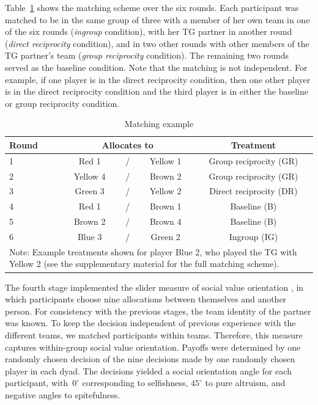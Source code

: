 \documentclass[12pt,a4paper]{article}\usepackage[]{graphicx}\usepackage[]{color}
\begin{document}
Table~\ref{tab:example} shows the matching scheme over the six rounds. Each participant was matched to be in the same group of three with a member of her own team in one of the six rounds (\emph{ingroup} condition), with her TG partner in another round (\emph{direct reciprocity} condition), and in two other rounds with other members of the TG partner's team (\emph{group reciprocity} condition). The remaining two rounds served as the baseline condition. Note that the matching is not independent. For example, if one player is in the direct reciprocity condition, then one other player is in the direct reciprocity condition and the third player is in either the baseline or group reciprocity condition.


\begin{table}
  \caption{Matching example}\label{tab:example}
  \begin{center}
    \begin{tabular}{lcccc}
    \toprule
    Round	&	\multicolumn{3}{c}{Allocates to}		&	Treatment	\\
    \midrule
    1	&	\color{red}Red 1	&	/	&	\color{yellow!80!black}Yellow 1	&	Group reciprocity (GR)	\\
    2	&	\color{yellow!80!black}Yellow 4	&	/	&	\color{brown}Brown 2	&	Group reciprocity (GR)	\\
    3	&	\color{green!60!black}Green 3	&	/	&	\color{yellow!80!black}Yellow 2	&	Direct reciprocity (DR)	\\
    4	&	\color{red}Red 1	&	/	&	\color{brown}Brown 1	&	Baseline (B)	\\
    5	&	\color{brown}Brown 2	&	/	&	\color{brown}Brown 4	&	Baseline (B)	\\
    6	&	\color{blue}Blue 3	&	/	&	\color{green!60!black}Green 2	&	Ingroup (IG)	\\
    \bottomrule
    \multicolumn{5}{p{0.7\textwidth}}{\footnotesize
	Note: Example treatments shown for player {\color{blue}Blue 2}, who played the TG with {\color{yellow!80!black}Yellow 2} (see the supplementary material for the full matching scheme).
    }
    \end{tabular}
  \end{center}
\end{table}

The fourth stage implemented the slider measure of social value orientation
\citep*{murphy2011measuring,crosetto2012flexible}, in which participants
choose nine allocations between themselves and another person. For
consistency with the previous stages, the team identity of the partner
was known. To keep the decision independent of previous experience
with the different teams, we matched participants within teams. Therefore, this measure captures within-group social value orientation. Payoffs
were determined by one randomly chosen decision of the nine decisions
made by one randomly chosen player in each dyad. The decisions yielded
a social orientation angle for each participant, with~$0^{\circ}$
corresponding to selfishness, $45^{\circ}$ to pure altruism, and
negative angles to spitefulness.
\end{document}

